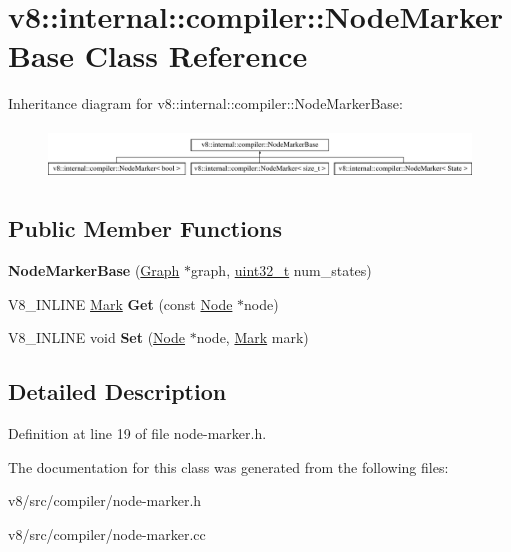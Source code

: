 \hypertarget{classv8_1_1internal_1_1compiler_1_1NodeMarkerBase}{}\section{v8\+:\+:internal\+:\+:compiler\+:\+:Node\+Marker\+Base Class Reference}
\label{classv8_1_1internal_1_1compiler_1_1NodeMarkerBase}
Inheritance diagram for v8\+:\+:internal\+:\+:compiler\+:\+:Node\+Marker\+Base\+:\begin{figure}[H]
\begin{center}
\leavevmode
\includegraphics[height=1.387856cm]{classv8_1_1internal_1_1compiler_1_1NodeMarkerBase}
\end{center}
\end{figure}
\subsection*{Public Member Functions}
\begin{DoxyCompactItemize}
\item 
\mbox{\label{classv8_1_1internal_1_1compiler_1_1NodeMarkerBase_ab86873db434c193862e8f0ffb34ab048}} 
{\bfseries Node\+Marker\+Base} (\mbox{\hyperlink{classv8_1_1internal_1_1compiler_1_1Graph}{Graph}} $\ast$graph, \mbox{\hyperlink{classuint32__t}{uint32\+\_\+t}} num\+\_\+states)
\item 
\mbox{\label{classv8_1_1internal_1_1compiler_1_1NodeMarkerBase_a9e3101ad8da20c0c173ae017bc8bedf7}} 
V8\+\_\+\+I\+N\+L\+I\+NE \mbox{\hyperlink{classuint32__t}{Mark}} {\bfseries Get} (const \mbox{\hyperlink{classv8_1_1internal_1_1compiler_1_1Node}{Node}} $\ast$node)
\item 
\mbox{\label{classv8_1_1internal_1_1compiler_1_1NodeMarkerBase_ad02e40edc769e208f8cc432c74a7d0d9}} 
V8\+\_\+\+I\+N\+L\+I\+NE void {\bfseries Set} (\mbox{\hyperlink{classv8_1_1internal_1_1compiler_1_1Node}{Node}} $\ast$node, \mbox{\hyperlink{classuint32__t}{Mark}} mark)
\end{DoxyCompactItemize}


\subsection{Detailed Description}


Definition at line 19 of file node-\/marker.\+h.



The documentation for this class was generated from the following files\+:\begin{DoxyCompactItemize}
\item 
v8/src/compiler/node-\/marker.\+h\item 
v8/src/compiler/node-\/marker.\+cc\end{DoxyCompactItemize}
